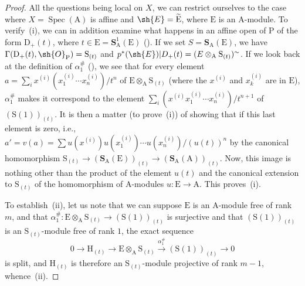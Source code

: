 \begin{proof}
All the questions being local on $X$, we can restrict ourselves to the case where $X=\operatorname{Spec}(\mathrm{A})$ is affine and $\sh{E}=\widetilde{\mathrm{E}}$, where $\mathrm{E}$ is an $\mathrm{A}$-module.
To verify~(i), we can in addition examine what happens in an affine open of $\mathrm{P}$ of the form $\mathrm{D}_+(t)$, where $t\in\mathrm{E}=\mathbf{S}_\mathrm{A}^1(\mathrm{E})$ ().
If we set $S=\mathbf{S}_\mathrm{A}(\mathrm{E})$, we have $\Gamma(\mathrm{D}_+(t),\sh{O}_{\mathrm{P}})=\mathrm{S}_{(t)}$ and $p^*(\sh{E})|D_+(t)=(E\otimes_\mathrm{A}\mathrm{S}_{(t)})^\sim$.
If we look back at the definition of $\alpha_1^{\#}$ (), we see that for every element $a=\sum_i x^{(i)}(x_1^{(i)}\cdots x_n^{(i)})/t^n$ of $\mathrm{E}\otimes_\mathrm{A}\mathrm{S}_{(t)}$ (where the $x^{(i)}$ and $x_k^{(i)}$ are in $\mathrm{E}$), $\alpha_1^{\#}$ makes it correspond to the element $\sum_i(x^{(i)}x_1^{(i)}\cdots x_n^{(i)})/t^{n+1}$ of $(\mathrm{S}(1))_{(t)}$.
It is then a matter (to prove~(i)) of showing that if this last element is zero, i.e., $a'=v(a)=\sum u(x^{(i)})u(x_1^{(i)})\cdots u(x_n^{(i)})/(u(t))^n$ by the canonical homomorphism $\mathrm{S}_{(t)}\to(\mathbf{S}_\mathrm{A}(\mathrm{E}))_{(t)}\to(\mathbf{S}_\mathrm{A}(\mathrm{A}))_{(t)}$.
Now, this image is nothing other than the product of the element $u(t)$ and the canonical extension to $\mathrm{S}_{(t)}$ of the homomorphism of $\mathrm{A}$-modules $u:\mathrm{E}\to\mathrm{A}$.
This proves~(i).

To establish~(ii), let us note that we can suppose $\mathrm{E}$ is an $\mathrm{A}$-module free of rank $m$, and that $\alpha_1^{\#}:\mathrm{E}\otimes_\mathrm{A}\mathrm{S}_{(t)}\to(\mathrm{S}(1))_{(t)}$ is surjective and that $(\mathrm{S}(1))_{(t)}$ is an $\mathrm{S}_{(t)}$-module free of rank $1$, the exact sequence
\[
  0\to\mathrm{H}_{(t)}\to\mathrm{E}\otimes_\mathrm{A}\mathrm{S}_{(t)}\xrightarrow{\alpha_1^{\#}}(\mathrm{S}(1))_{(t)}\to 0
\]
is split, and $\mathrm{H}_{(t)}$ is therefore an $\mathrm{S}_{(t)}$-module projective of rank $m-1$, whence~(ii).


\end{proof}
